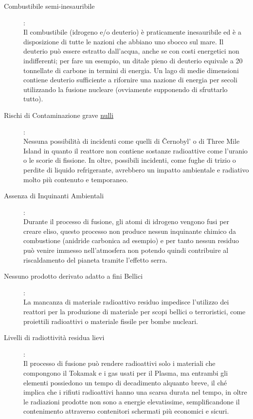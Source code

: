 \begin{description}
	\item [Combustibile semi-inesauribile]:\\
	      Il combustibile (idrogeno e/o deuterio) è praticamente inesauribile ed è a disposizione di tutte le nazioni che abbiano uno sbocco sul mare. Il deuterio può essere estratto dall'acqua, anche se con costi energetici non indifferenti; per fare un esempio, un ditale pieno di deuterio equivale a 20 tonnellate di carbone in termini di energia. Un lago di medie dimensioni contiene deuterio sufficiente a rifornire una nazione di energia per secoli utilizzando la fusione nucleare (ovviamente supponendo di sfruttarlo tutto).
	\item [Rischi di Contaminazione grave \underline{nulli}]:\\
	      Nessuna possibilità di incidenti come quelli di Černobyl' o di Three Mile Island in quanto il reattore non contiene sostanze radioattive come l'uranio o le scorie di fissione. In oltre, possibili incidenti, come fughe di trizio o perdite di liquido refrigerante, avrebbero un impatto ambientale e radiativo molto più contenuto e temporaneo.
	\item [Assenza di Inquinanti Ambientali]:\\
	      Durante il processo di fusione, gli atomi di idrogeno vengono fusi per creare eliso, questo processo non produce nessun inquinante chimico da combustione (anidride carbonica ad esempio) e per tanto nessun residuo può venire immesso nell'atmosfera non potendo quindi contribuire al riscaldamento del pianeta tramite l'effetto serra.
	\item [Nessuno prodotto derivato adatto a fini Bellici]:\\
	      La mancanza di materiale radioattivo residuo impedisce l'utilizzo dei reattori per la produzione di materiale per scopi bellici o terroristici, come proiettili radioattivi o materiale fissile per bombe nucleari.
	\item [Livelli di radiottività residua lievi]:\\
	      Il processo di fusione può rendere radioattivi solo i materiali che compongono il Tokamak e i gas usati per il Plasma, ma entrambi gli elementi possiedono un tempo di decadimento alquanto breve, il ché implica che i rifiuti radioattivi hanno una scarsa durata nel tempo, in oltre le radiazioni prodotte non sono a energie elevatissime, semplificandone il contenimento attraverso contenitori schermati più economici e sicuri.
\end{description}
